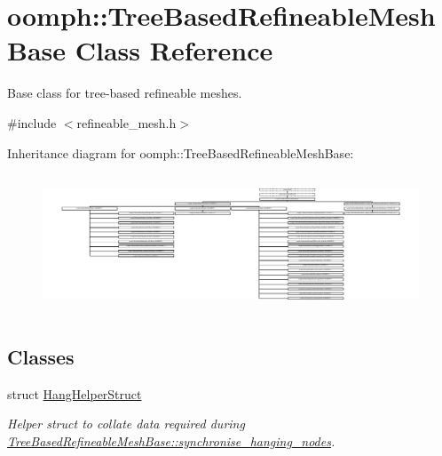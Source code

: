 \hypertarget{classoomph_1_1TreeBasedRefineableMeshBase}{}\section{oomph\+:\+:Tree\+Based\+Refineable\+Mesh\+Base Class Reference}
\label{classoomph_1_1TreeBasedRefineableMeshBase}


Base class for tree-\/based refineable meshes.  




{\ttfamily \#include $<$refineable\+\_\+mesh.\+h$>$}

Inheritance diagram for oomph\+:\+:Tree\+Based\+Refineable\+Mesh\+Base\+:\begin{figure}[H]
\begin{center}
\leavevmode
\includegraphics[height=4.148148cm]{classoomph_1_1TreeBasedRefineableMeshBase}
\end{center}
\end{figure}
\subsection*{Classes}
\begin{DoxyCompactItemize}
\item 
struct \hyperlink{structoomph_1_1TreeBasedRefineableMeshBase_1_1HangHelperStruct}{Hang\+Helper\+Struct}
\begin{DoxyCompactList}\small\item\em Helper struct to collate data required during \hyperlink{classoomph_1_1TreeBasedRefineableMeshBase_a0ba902eb4b63aaa8c4da1aadcf25709a}{Tree\+Based\+Refineable\+Mesh\+Base\+::synchronise\+\_\+hanging\+\_\+nodes}. \end{DoxyCompactList}\end{DoxyCompactItemize}
